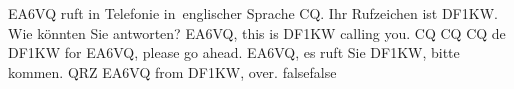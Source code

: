     {EA6VQ ruft in Telefonie in englischer Sprache CQ. Ihr Rufzeichen ist DF1KW. Wie könnten Sie antworten?}
    {EA6VQ, this is DF1KW calling you.}
    {CQ CQ CQ de DF1KW for EA6VQ, please go ahead.}
    {EA6VQ, es ruft Sie DF1KW, bitte kommen.}
    {QRZ EA6VQ from DF1KW, over.}
    {false}{false}